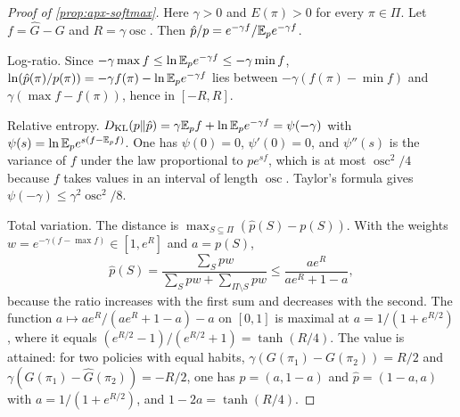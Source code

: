\begin{proof}[Proof of \cref{prop:apx-softmax}]
Here $\gamma>0$ and $E(\pi)>0$ for every $\pi\in\Pi$. Let $f=\hat G-G$ and $R=\gamma\operatorname{osc}$. Then $\hat p/p=e^{-\gamma f}/\mathbb{E}_pe^{-\gamma f}$.

Log-ratio. Since $-\gamma\max f\le\ln\mathbb{E}_pe^{-\gamma f}\le-\gamma\min f$, $\ln(\hat p(\pi)/p(\pi))=-\gamma f(\pi)-\ln\mathbb{E}_pe^{-\gamma f}$ lies between $-\gamma(f(\pi)-\min f)$ and $\gamma(\max f-f(\pi))$, hence in $[-R,R]$.

Relative entropy. $D_{\mathrm{KL}}(p\Vert\hat p)=\gamma\mathbb{E}_pf+\ln\mathbb{E}_pe^{-\gamma f}=\psi(-\gamma)$ with $\psi(s)=\ln\mathbb{E}_pe^{s(f-\mathbb{E}_pf)}$. One has $\psi(0)=0$, $\psi'(0)=0$, and $\psi''(s)$ is the variance of $f$ under the law proportional to $pe^{sf}$, which is at most $\operatorname{osc}^2/4$ because $f$ takes values in an interval of length $\operatorname{osc}$. Taylor's formula gives $\psi(-\gamma)\le\gamma^2\operatorname{osc}^2/8$.

Total variation. The distance is $\max_{S\subseteq\Pi}(\hat p(S)-p(S))$. With the weights $w=e^{-\gamma(f-\max f)}\in[1,e^R]$ and $a=p(S)$,
\begin{equation*}
\hat p(S)=\frac{\sum_Spw}{\sum_Spw+\sum_{\Pi\setminus S}pw}\le\frac{ae^R}{ae^R+1-a},
\end{equation*}
because the ratio increases with the first sum and decreases with the second. The function $a\mapsto ae^R/(ae^R+1-a)-a$ on $[0,1]$ is maximal at $a=1/(1+e^{R/2})$, where it equals $(e^{R/2}-1)/(e^{R/2}+1)=\tanh(R/4)$. The value is attained: for two policies with equal habits, $\gamma(G(\pi_1)-G(\pi_2))=R/2$ and $\gamma(\hat G(\pi_1)-\hat G(\pi_2))=-R/2$, one has $p=(a,1-a)$ and $\hat p=(1-a,a)$ with $a=1/(1+e^{R/2})$, and $1-2a=\tanh(R/4)$.
\end{proof}

